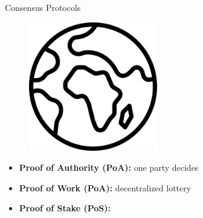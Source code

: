 \documentclass[]{beamer}
\begin{document}

\begin{frame}{Consensus Protocols}

\begin{figure}
	\includegraphics[width = 0.5\textwidth]{../assets/images/globe.png}	
\end{figure}

\vspace{1.5em}

\begin{itemize}
	\item<2-> \textbf{Proof of Authority (PoA):} one party decides
	\item<3-> \textbf{Proof of Work (PoA):} decentralized lottery
	\item<4-> \textbf{Proof of Stake (PoS):} 

\end{itemize}

\end{frame}
\end{document}
